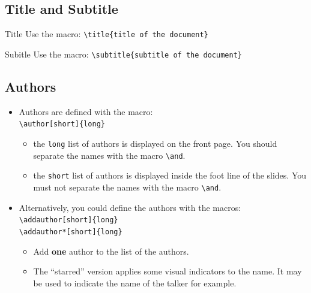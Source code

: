 \documentclass[english,circlenumberstyle]{irtesbeamer}
\begin{document}
\subsection{Title and Subtitle}
\begin{frame}{\subsecname}
	\begin{block}{Title}
		Use the macro: \texttt{{\textbackslash}title\{title of the document\}}
	\end{block}
	\begin{block}{Subitle}
		Use the macro: \texttt{{\textbackslash}subtitle\{subtitle of the document\}}
	\end{block}
\end{frame}

\subsection{Authors}
\begin{frame}{\subsecname}
	\begin{itemize}
	\item Authors are defined with the macro: \\
		\texttt{{\textbackslash}author[short]\{long\}}
		\begin{itemize}
		\item the \texttt{long} list of authors is displayed on the front page. You should separate the names with the macro \texttt{{\textbackslash}and}.
		\item the \texttt{short} list of authors is displayed inside the foot line of the slides. You \alert{must not separate} the names with the macro \texttt{{\textbackslash}and}.
		\end{itemize}
	\item Alternatively, you could define the authors with the macros: \\
		\texttt{{\textbackslash}addauthor[short]\{long\}} \\
		\texttt{{\textbackslash}addauthor*[short]\{long\}}
		\begin{itemize}
		\item Add \textbf{one} author to the list of the authors.
		\item The ``starred'' version applies some visual indicators to the name. It may be used to indicate the name of the talker for example.
		\end{itemize}
	\end{itemize}
\end{frame}
\end{document}
